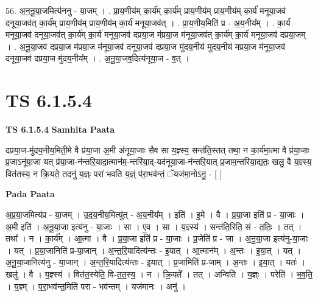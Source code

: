 \documentclass[17pt]{extarticle}
\begin{document}
56. अ॒न॒नू॒या॒जमित्य॑ननु - या॒जम् । . प्रा॒य॒णीय॑म् का॒र्य॑म् का॒र्य॑म् प्राय॒णीय॑म् प्राय॒णीय॑म् का॒र्य॑ मनूया॒जव॑ दनूया॒जव॑त् का॒र्य॑म् प्राय॒णीय॑म् प्राय॒णीय॑म् का॒र्य॑ मनूया॒जव॑त् । . प्रा॒य॒णीय॒मिति॑ प्र - अ॒य॒नीय᳚म् । . का॒र्य॑ मनूया॒जव॑ दनूया॒जव॑त् का॒र्य॑म् का॒र्य॑ मनूया॒जव॑ दप्रया॒ज म॑प्रया॒ज म॑नूया॒जव॑त् का॒र्य॑म् का॒र्य॑ मनूया॒जव॑ दप्रया॒जम् । . अ॒नू॒या॒जव॑ दप्रया॒ज म॑प्रया॒ज म॑नूया॒जव॑ दनूया॒जव॑ दप्रया॒ज मु॑दय॒नीय॑ मुदय॒नीय॑ मप्रया॒ज म॑नूया॒जव॑ दनूया॒जव॑ दप्रया॒ज मु॑दय॒नीय᳚म् । . अ॒नू॒या॒जव॒दित्य॑नूया॒ज - व॒त् । \newline
\pagebreak
{}

\section{ TS 6.1.5.4 }

\textbf{TS 6.1.5.4 } \newline
\textbf{Samhita Paata} \newline

दप्रया॒ज-मु॑दय॒नीय॒मिती॒मे वै प्र॑या॒जा अ॒मी अ॑नूया॒जाः सैव सा य॒ज्ञ्स्य॒ सन्त॑ति॒स्तत् तथा॒ न का॒र्य॑मा॒त्मा वै प्र॑या॒जाः प्र॒जाऽनू॑या॒जा यत् प्र॑या॒जा-न॑न्तरि॒यादा॒त्मान॑म॒-न्तरि॑या॒द्-यद॑नूया॒जा-न॑न्तरि॒यात् प्र॒जाम॒न्तरि॑या॒द्यतः॒ खलु॒ वै य॒ज्ञ्स्य॒ वित॑तस्य॒ न क्रि॒यते॒ तदनु॑ य॒ज्ञ्ः परा॑ भवति य॒ज्ञ्ं प॑रा॒भव॑न्तं॒ ॅयज॑मा॒नोऽनु॒ - [  ] \newline

\textbf{Pada Paata} \newline

अ॒प्र॒या॒जमित्य॑प्र - या॒जम् । उ॒द॒य॒नीय॒मित्यु॑त् - अ॒य॒नीय᳚म् । इति॑ । इ॒मे । वै । प्र॒या॒जा इति॑ प्र - या॒जाः । अ॒मी इति॑ । अ॒नू॒या॒जा इत्य॑नु - या॒जाः । सा । ए॒व । सा । य॒ज्ञ्स्य॑ । सन्त॑ति॒रिति॒ सं - त॒तिः॒ । तत् । तथा᳚ । न । का॒र्य᳚म् । आ॒त्मा । वै । प्र॒या॒जा इति॑ प्र - या॒जाः । प्र॒जेति॑ प्र - जा । अ॒नू॒या॒जा इत्य॑नु-या॒जाः । यत् । प्र॒या॒जानिति॑ प्र-या॒जान् । अ॒न्त॒रि॒यादित्य॑न्तः - इ॒यात् । आ॒त्मान᳚म् । अ॒न्तः । इ॒या॒त् । यत् । अ॒नू॒या॒जानित्य॑नु - या॒जान् । अ॒न्त॒रि॒यादित्य॑न्तः - इ॒यात् । प्र॒जामिति॑ प्र-जाम् । अ॒न्तः । इ॒या॒त् । यतः॑ । खलु॑ । वै । य॒ज्ञ्स्य॑ । वित॑त॒स्येति॒ वि-त॒त॒स्य॒ । न । क्रि॒यते᳚ । तत् । अन्विति॑ । य॒ज्ञ्ः । परेति॑ । भ॒व॒ति॒ । य॒ज्ञ्म् । प॒रा॒भव॑न्त॒मिति॑ परा - भव॑न्तम् । यज॑मानः । अनु॑ ।  \newline
\end{document}
